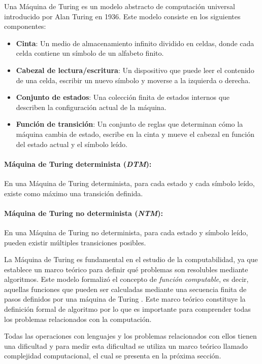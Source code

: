 Una Máquina de Turing \cite{authomataTheory} es un modelo abstracto de computación universal introducido por Alan Turing en 1936. Este modelo consiste en los siguientes componentes:

\begin{itemize}
      \item \textbf{Cinta}: Un medio de almacenamiento infinito dividido en celdas, donde cada celda contiene un símbolo de un alfabeto finito.
      \item \textbf{Cabezal de lectura/escritura}: Un dispositivo que puede leer el contenido de una celda, escribir un nuevo símbolo y moverse a la izquierda o derecha.
      \item \textbf{Conjunto de estados}: Una colección finita de estados internos que describen la configuración actual de la máquina.
      \item \textbf{Función de transición}: Un conjunto de reglas que determinan cómo la máquina cambia de estado, escribe en la cinta y mueve el cabezal en función del estado actual y el símbolo leído.
\end{itemize}

\paragraph{Máquina de Turing determinista (\textit{DTM}):}
En una Máquina de Turing determinista, para cada estado y cada símbolo leído, existe como máximo una transición
definida.
\paragraph{Máquina de Turing no determinista (\textit{NTM}):}
En una Máquina de Turing no determinista, para cada estado y símbolo leído, pueden existir múltiples
transiciones posibles.

La Máquina de Turing es fundamental en el estudio de la computabilidad, ya que establece un marco teórico para definir qué problemas son resolubles mediante algoritmos. Este modelo formalizó el concepto de \textit{función computable}, es decir, aquellas funciones que pueden ser calculadas mediante una secuencia finita de pasos definidos por una máquina de Turing \cite{authomataTheory}. Este marco teórico constituye
la definición formal de algoritmo \cite{authomataTheory} por lo que es importante para comprender todas los problemas relacionados con la computación.

Todas las operaciones con lenguajes y los problemas relacionados con ellos tienen una dificultad y para medir esta dificultad
se utiliza un marco teórico llamado complejidad computacional, el cual se presenta en la próxima sección.

